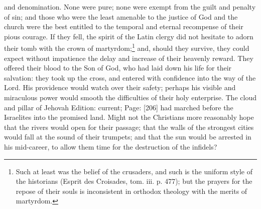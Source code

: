 and denomination. None were pure; none were exempt from the guilt and penalty of sin; and those who were the least amenable to the justice of God and the church were the best entitled to the temporal and eternal recompense of their pious courage. If they fell, the spirit of the Latin clergy did not hesitate to adorn their tomb with the crown of martyrdom;\footnote{Such at least was the belief of the crusaders, and such is the uniform style of the historians (Esprit des Croisades, tom. iii. p. 477); but the prayers for the repose of their souls is inconsistent in orthodox theology with the merits of martyrdom.} and, should they survive, they could expect without impatience the delay and increase of their heavenly reward. They offered their blood to the Son of God, who had laid down his life for their salvation: they took up the cross, and entered with confidence into the way of the Lord. His providence would watch over their safety; perhaps his visible and miraculous power would smooth the difficulties of their holy enterprise. The cloud and pillar of Jehovah Edition: current; Page: [206] had marched before the Israelites into the promised land. Might not the Christians more reasonably hope that the rivers would open for their passage; that the walls of the strongest cities would fall at the sound of their trumpets; and that the sun would be arrested in his mid-career, to allow them time for the destruction of the infidels?

